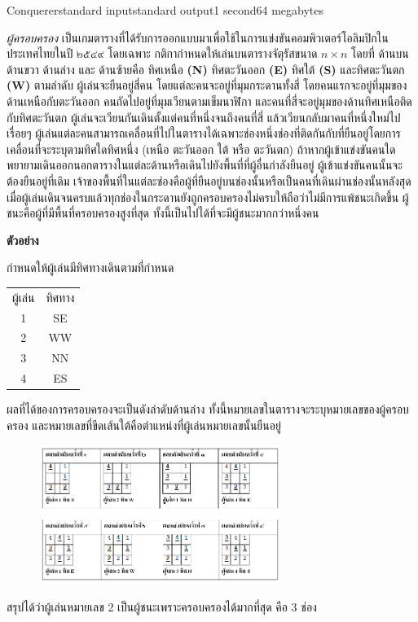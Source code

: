 \documentclass[11pt,a4paper]{article}
\begin{document}
\begin{problem}{Conquerer}{standard input}{standard output}{1 second}{64 megabytes}

\textit{ผู้ครอบครอง} เป็นเกมตารางที่ได้รับการออกแบบมาเพื่อใช้ในการแข่งขันคอมพิวเตอร์โอลิมปิกในประเทศไทยในปี ๒๕๔๙ โดยเฉพาะ กติกากำหนดให้เล่นบนตารางจัตุรัสขนาด $n\times n$ โดยที่ ด้านบน ด้านขวา ด้านล่าง และ ด้านซ้ายคือ ทิศเหนือ \textbf{(N)} ทิศตะวันออก \textbf{(E)} ทิศใต้ \textbf{(S)} และทิศตะวันตก \textbf{(W)} ตามลำดับ ผู้เล่นจะยืนอยู่สี่คน โดยแต่ละคนจะอยู่ที่มุมกระดานทั้งสี่ โดยคนแรกจะอยู่ที่มุมของด้านเหนือกับตะวันออก คนถัดไปอยู่ที่มุมเวียนตามเข็มนาฬิกา และคนที่สี่จะอยู่มุมของด้านทิศเหนือติดกับทิศตะวันตก ผู้เล่นจะเวียนกันเดินตั้งแต่คนที่หนึ่งจนถึงคนที่สี่ แล้วเวียนกลับมาคนที่หนึ่งใหม่ไปเรื่อยๆ ผู้เล่นแต่ละคนสามารถเคลื่อนที่ไปในตารางได้เฉพาะช่องหนึ่งช่องที่ติดกันกับที่ยืนอยู่โดยการเคลื่อนที่จะระบุตามทิศใดทิศหนึ่ง (เหนือ ตะวันออก ใต้ หรือ ตะวันตก) ถ้าหากผู้เข้าแข่งขันคนใดพยายามเดินออกนอกตารางในแต่ละด้านหรือเดินไปยังพื้นที่ที่ผู้อื่นกำลังยืนอยู่ ผู้เข้าแข่งขันคนนั้นจะต้องยืนอยู่ที่เดิม เจ้าของพื้นที่ในแต่ละช่องคือผู้ที่ยืนอยู่บนช่องนั้นหรือเป็นคนที่เดินผ่านช่องนั้นหลังสุด เมื่อผู้เล่นเดินจนครบแล้วทุกช่องในกระดานยังถูกครอบครองไม่ครบให้ถือว่าไม่มีการแพ้ชนะเกิดขึ้น ผู้ชนะคือผู้ที่มีพื้นที่ครอบครองสูงที่สุด ทั้งนี้เป็นไปได้ที่จะมีผู้ชนะมากกว่าหนึ่งคน
\bigskip

\textbf{ตัวอย่าง}

กำหนดให้ผู้เล่นมีทิศทางเดินตามที่กำหนด

\begin{tabular}{cc}
ผู้เล่น	&ทิศทาง\\
1	&SE\\
2	&WW\\
3	&NN\\
4	&ES\\
\end{tabular}

ผลที่ได้ของการครอบครองจะเป็นดังลำดับด้านล่าง ทั้งนี้หมายเลขในตารางจะระบุหมายเลขของผู้ครอบครอง และหมายเลขที่ขีดเส้นใต้คือตำแหน่งที่ผู้เล่นหมายเลขนั้นยืนอยู่

\begin{figure}[h]
\centering
\includegraphics[width=0.7\textwidth]{../latex/img/1033/1033-1.png}
\end{figure}
สรุปได้ว่าผู้เล่นหมายเลข 2 เป็นผู้ชนะเพราะครอบครองได้มากที่สุด คือ 3 ช่อง


\end{problem}
\end{document}
